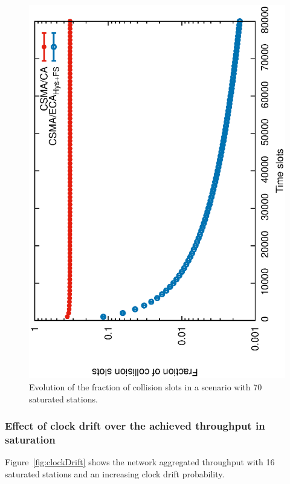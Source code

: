 	\begin{figure}[tb]
	\centering
		\includegraphics[width=0.7\linewidth,angle=-90]{figures/saturated/slots/Pc-evolution-TON.eps}
		\caption{Evolution of the fraction of collision slots in a scenario with 70 saturated stations.}
		\label{fig:collisions-evolution}
	\end{figure}
	
	\subsubsection{Effect of clock drift over the achieved throughput in saturation}\label{performanceClockDrift}
	Figure~\ref{fig:clockDrift} shows the network aggregated throughput with 16 saturated stations and an increasing clock drift probability.
	
